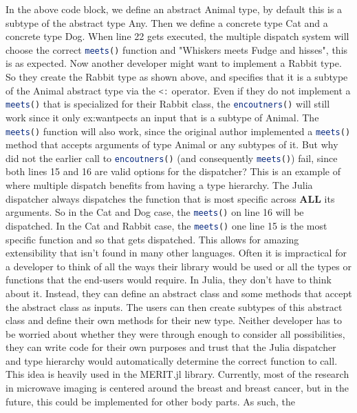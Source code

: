 In the above code block, we define an abstract Animal type, by default this is a subtype of the abstract type Any. Then
we define a concrete type Cat and a concrete type Dog. When line 22 gets executed, the multiple dispatch system will
choose the correct \lstinline[language=Julia]|meets()| function and "Whiskers meets Fudge and hisses", this is as expected. Now another developer
might want to implement a Rabbit type. So they create the Rabbit type as shown above, and specifies that it is a subtype
of the Animal abstract type via the \lstinline[language=Julia]{<:} operator. Even if they do not implement a
\lstinline[language=Julia]{meets()} that is specialized for their Rabbit class, the
\lstinline[language=Julia]{encoutners()} will still work since it only ex:wantpects an input that is a subtype of Animal. The
\lstinline[language=Julia]{meets()} function will also work, since the original author implemented a
\lstinline[language=Julia]{meets()} method that accepts arguments of type Animal or any subtypes of it. But why did not the earlier call to \lstinline[language=Julia]{encoutners()} (and consequently \lstinline[language=Julia]{meets()})
fail, since both lines 15 and 16 are valid options for the dispatcher? This is an example of where multiple dispatch
benefits from having a type hierarchy. The Julia dispatcher always dispatches the function that is most specific across
\textbf{ALL} its arguments. So in the Cat and Dog case, the \lstinline[language=Julia]{meets()} on line 16 will be
dispatched. In the Cat and Rabbit case, the \lstinline[language=Julia]{meets()} one line 15 is the most specific
function and so that gets dispatched. This allows for amazing extensibility that isn't found in many other languages. Often
it is impractical for a developer to think of all the ways their library would be used or all the types or functions
that the end-users would require. In Julia, they don't have to think about it. Instead, they can define an abstract
class and some methods that accept the abstract class as inputs. The users can then create subtypes of this abstract
class and define their own methods for their new type. Neither developer has to be worried about whether they were through
enough to consider all possibilities, they can write code for their own purposes and trust that the Julia dispatcher and
type hierarchy would automatically determine the correct function to call. \hfill \break
This idea is heavily used in the MERIT.jl library. Currently, most of the research in microwave imaging is centered
around the breast and breast cancer, but in the future, this could be implemented for other body parts. As such, the
